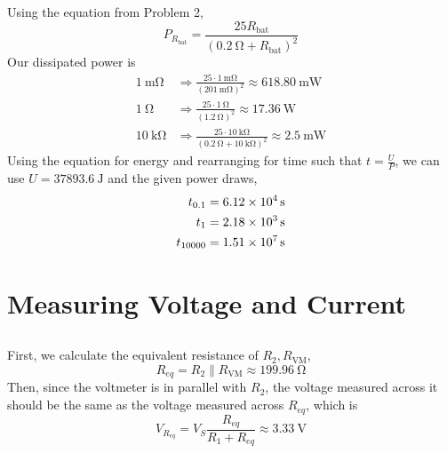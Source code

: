 \documentclass[]{article}
\begin{document}
\subsection{}

Using the equation from Problem 2,
\begin{equation}
	P_{R_{\text{bat}}} = \frac{25 R_{\text{bat}}}{(0.2 \ \si{\ohm} + R_{\text{bat}})^2}
\end{equation}
Our dissipated power is 
\begin{align}
	\SI{1}{\milli\ohm} &\Rightarrow \frac{25 \cdot 1 \ \si{\milli\ohm}}{(201 \ \si{\milli\ohm})^2} \approx \SI{618.80}{\milli\watt} \\
	\SI{1}{\ohm} &\Rightarrow \frac{25 \cdot 1 \ \si{\ohm}}{(1.2 \ \si{\ohm})^2} \approx \SI{17.36}{\watt} \\
	\SI{10}{\kilo\ohm} &\Rightarrow \frac{25 \cdot 10 \ \si{\kilo\ohm}}{(0.2 \ \si{\ohm} + 10 \ \si{\kilo\ohm})^2} \approx \SI{2.5}{\milli\watt}
\end{align}
Using the equation for energy and rearranging for time such that \(t = \frac{U}{P}\), we can use \(U = \SI{37893.6}{\joule}\) and the given power draws, 
\begin{align}
	t_{0.1} &= \SI{6.12d4}{\second} \\
	t_1 &= \SI{2.18d3}{\second} \\
	t_{10000} &= \SI{1.51d7}{\second}
\end{align}

\section{Measuring Voltage and Current}

\subsection{}

First, we calculate the equivalent resistance of \(R_2, R_{\text{VM}}\), 
\begin{equation}
	R_{eq} = R_2 \parallel R_{\text{VM}} \approx \SI{199.96}{\ohm}
\end{equation}
Then, since the voltmeter is in parallel with \(R_2\), the voltage measured across it should be the same as the voltage measured across \(R_{eq}\), which is 
\begin{equation}
	V_{R_{eq}} = V_S \frac{R_{eq}}{R_1 + R_{eq}} \approx \SI{3.33}{\volt}
\end{equation}
\end{document}
